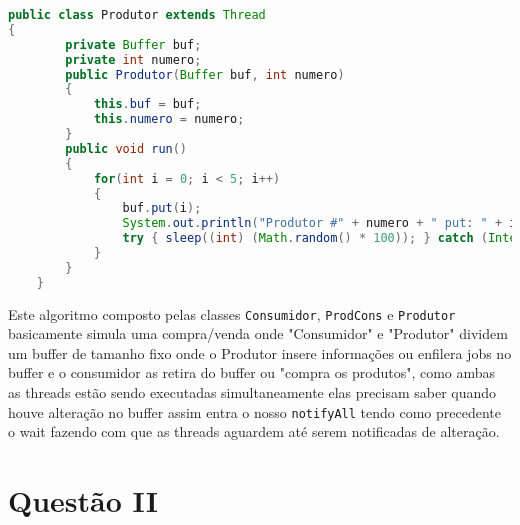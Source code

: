 \documentclass[10pt]{article}
\begin{document}
\begin{lstlisting}[language=Java,caption=Produtor.java]
public class Produtor extends Thread
{
        private Buffer buf;
        private int numero;
        public Produtor(Buffer buf, int numero)
        {
            this.buf = buf;
            this.numero = numero;
        }
        public void run()
        {
            for(int i = 0; i < 5; i++)
            {
                buf.put(i);
                System.out.println("Produtor #" + numero + " put: " + i);
                try { sleep((int) (Math.random() * 100)); } catch (InterruptedException e) {}
            }
        }
    }
\end{lstlisting}
Este algoritmo composto pelas classes \verb|Consumidor|, \verb|ProdCons| e \verb|Produtor| basicamente simula uma compra/venda onde "Consumidor" e "Produtor" dividem um buffer de tamanho fixo onde o Produtor insere informações ou enfilera jobs no buffer e o consumidor as retira do buffer ou "compra os produtos", como ambas as threads estão sendo executadas simultaneamente elas precisam saber quando houve alteração no buffer assim entra o nosso \verb|notifyAll| tendo como precedente o wait fazendo com que as threads aguardem até serem notificadas de alteração.
\section{Questão II}
\end{document}
